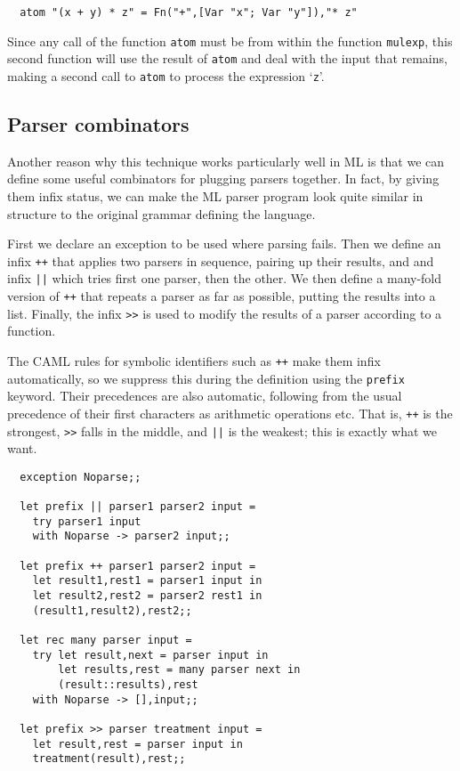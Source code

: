 \begin{boxed}\begin{verbatim}
  atom "(x + y) * z" = Fn("+",[Var "x"; Var "y"]),"* z"
\end{verbatim}\end{boxed}

Since any call of the function {\verb+atom+} must be from within the function
{\verb!mulexp!}, this second function will use the result of {\verb!atom!} and
deal with the input that remains, making a second call to {\verb!atom!} to
process the expression `{\verb!z!}'.

\subsection{Parser combinators}

Another reason why this technique works particularly well in ML is that we can
define some useful combinators for plugging parsers together. In fact, by
giving them infix status, we can make the ML parser program look quite similar
in structure to the original grammar defining the language.

First we declare an exception to be used where parsing fails. Then we define an
infix {\verb!++!} that applies two parsers in sequence, pairing up their
results, and and infix {\verb!||!} which tries first one parser, then the
other. We then define a many-fold version of {\verb!++!} that repeats a parser
as far as possible, putting the results into a list. Finally, the infix
{\verb!>>!} is used to modify the results of a parser according to a function.

The CAML rules for symbolic identifiers such as {\verb!++!} make them infix
automatically, so we suppress this during the definition using the {\tt prefix}
keyword. Their precedences are also automatic, following from the usual
precedence of their first characters as arithmetic operations etc. That is,
{\verb!++!} is the strongest, {\verb!>>!} falls in the middle, and {\verb!||!}
is the weakest; this is exactly what we want.

\begin{boxed}\begin{verbatim}
  exception Noparse;;

  let prefix || parser1 parser2 input =
    try parser1 input
    with Noparse -> parser2 input;;

  let prefix ++ parser1 parser2 input =
    let result1,rest1 = parser1 input in
    let result2,rest2 = parser2 rest1 in
    (result1,result2),rest2;;

  let rec many parser input =
    try let result,next = parser input in
        let results,rest = many parser next in
        (result::results),rest
    with Noparse -> [],input;;

  let prefix >> parser treatment input =
    let result,rest = parser input in
    treatment(result),rest;;
\end{verbatim}\end{boxed}

